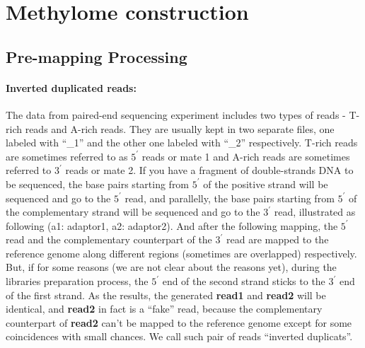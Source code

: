 \documentclass[10pt]{article}
\begin{document}
\section{Methylome construction}

\subsection{Pre-mapping Processing}
\label{sec:premapping}

\paragraph{Inverted duplicated reads:} 
The data from paired-end sequencing experiment includes two types of reads - T-rich reads and A-rich reads. They are usually kept in two separate files, one labeled with ``\_1'' and the other one labeled with ``\_2'' respectively. T-rich reads are sometimes referred to as $5^{\prime}$ reads or mate 1 and A-rich reads are sometimes referred to $3^{\prime}$ reads or mate 2. If you have a fragment of double-strands DNA to be sequenced, the base pairs starting from $5^{\prime}$ of the positive strand will be sequenced and go to the $5^{\prime}$ read, and parallelly, the base pairs starting from $5^{\prime}$ of the complementary strand will be sequenced and go to the $3^{\prime}$ read, illustrated as following (a1: adaptor1, a2: adaptor2).
And after the following mapping, the $5^{\prime}$ read and the complementary counterpart of the $3^{\prime}$ read are mapped to the reference genome along different regions (sometimes are overlapped) respectively. But, if for some reasons (we are not clear about the reasons yet), during the libraries preparation process, the $5^{\prime}$ end of the second strand sticks to the $3^{\prime}$ end of the first strand. As the results, the generated \textbf{read1} and \textbf{read2} will be identical, and \textbf{read2} in fact is a ``fake'' read, because the complementary counterpart of \textbf{read2} can't be mapped to the reference genome except for some coincidences with small chances. We call such pair of reads ``inverted duplicats''.
\end{document}

